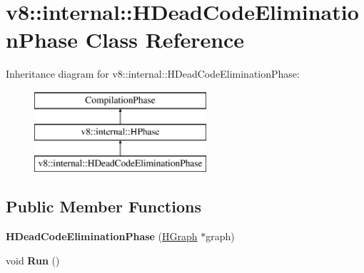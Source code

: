 \hypertarget{classv8_1_1internal_1_1_h_dead_code_elimination_phase}{}\section{v8\+:\+:internal\+:\+:H\+Dead\+Code\+Elimination\+Phase Class Reference}
\label{classv8_1_1internal_1_1_h_dead_code_elimination_phase}
Inheritance diagram for v8\+:\+:internal\+:\+:H\+Dead\+Code\+Elimination\+Phase\+:\begin{figure}[H]
\begin{center}
\leavevmode
\includegraphics[height=3.000000cm]{classv8_1_1internal_1_1_h_dead_code_elimination_phase}
\end{center}
\end{figure}
\subsection*{Public Member Functions}
\begin{DoxyCompactItemize}
\item 
{\bfseries H\+Dead\+Code\+Elimination\+Phase} (\hyperlink{classv8_1_1internal_1_1_h_graph}{H\+Graph} $\ast$graph)\hypertarget{classv8_1_1internal_1_1_h_dead_code_elimination_phase_a7fffb6b1cbfd8e7dbedad366aba5b69b}{}\label{classv8_1_1internal_1_1_h_dead_code_elimination_phase_a7fffb6b1cbfd8e7dbedad366aba5b69b}

\item 
void {\bfseries Run} ()\hypertarget{classv8_1_1internal_1_1_h_dead_code_elimination_phase_a29fada16a710d5a6dcb6b0aa2af5d936}{}\label{classv8_1_1internal_1_1_h_dead_code_elimination_phase_a29fada16a710d5a6dcb6b0aa2af5d936}

\end{DoxyCompactItemize}
